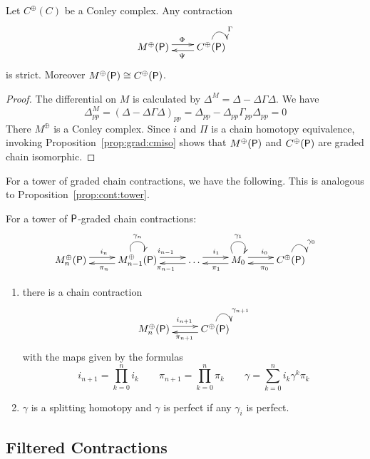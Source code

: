 \begin{prop}
Let $C^\oplus(C)$ be a Conley complex.  Any contraction
 \[
\xymatrixrowsep{0.03in}
\xymatrixcolsep{0.3in}
\xymatrix{
M^\oplus(\sP)  \ar[r]<3pt>^{\Phi} & \ar[l]<3pt>^{\Psi} C^\oplus(\sP) \ar@(u,r)^{\Gamma}
}
\]
is strict. Moreover $M^\oplus({\mathsf P})\cong C^\oplus({\mathsf P})$.
\end{prop}
\begin{proof}
The differential on $M$ is calculated by $\Delta^M = \Delta-\Delta\Gamma\Delta$.  We have 
\[
\Delta^M_{pp} = (\Delta-\Delta\Gamma\Delta)_{pp} = \Delta_{pp}-\Delta_{pp}\Gamma_{pp}\Delta_{pp} = 0
\]
There $M^\oplus$ is a Conley complex.  Since $i$ and $\Pi$ is a chain homotopy equivalence, invoking Proposition~\ref{prop:grad:cmiso} shows that $M^\oplus({\mathsf P})$ and $C^\oplus({\mathsf P})$ are graded chain isomorphic. 
\end{proof}

For a tower of graded chain contractions, we have the following.  This is analogous to Proposition~\ref{prop:cont:tower}.

\begin{prop}
For a tower of ${\mathsf P}$-graded chain contractions:
\[
\xymatrixrowsep{0.03in}
\xymatrixcolsep{0.35in}
\xymatrix{
M_n^\oplus(\sP) \ar[r]<3pt>^{i_n} & \ar[l]<3pt>^{\pi_n } M_{n-1}^\oplus(\sP) \ar@(ul,ur)^{\gamma_n} \ar[r]<3pt>^{i_{n-1}} & \ar[l]<3pt>^{\pi_{n-1}}  \ldots \ar[r]<3pt>^{i_1}  & \ar[l]<3pt>^{\pi_1 }M_0 \ar@(ul,ur)^{\gamma_1}  \ar[r]<3pt>^{i_0} & \ar[l]<3pt>^{\pi_0} C^\oplus(\sP) \ar@(u,r)^{\gamma_0}
}
\]

\begin{enumerate}
\item there is a chain contraction 
\begin{align}\label{dia:cont:tower}
\xymatrixrowsep{0.03in}
\xymatrixcolsep{0.35in}
\xymatrix{
M_n^\oplus(\sP) \ar[r]<3pt>^{i_{n+1}} & \ar[l]<3pt>^{\pi_{n+1}} C^\oplus(\sP) \ar@(u,r)^{\gamma_{n+1} }
}
\end{align}
with the maps given by the formulas
\[
i_{n+1} = \prod_{k=0}^n i_k \quad\quad \pi_{n+1} = \prod_{k=0}^n \pi_k \quad\quad \gamma = \sum_{k=0}^n i_k \gamma^k \pi_k
\]
\item $\gamma$ is a splitting homotopy and $\gamma$ is perfect if any $\gamma_i$ is perfect.

\end{enumerate}
\end{prop}



\subsection{Filtered Contractions}
 
